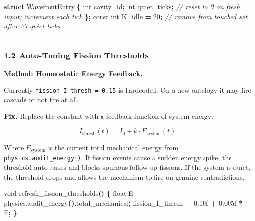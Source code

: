 \documentclass[
  11pt,
  a4paper,
]{article}
\newenvironment{Shaded}{\begin{snugshade}}{\end{snugshade}}
\newcommand{\AttributeTok}[1]{\textcolor[rgb]{0.13,0.29,0.53}{#1}}
\newcommand{\BuiltInTok}[1]{#1}
\newcommand{\CommentTok}[1]{\textcolor[rgb]{0.56,0.35,0.01}{\textit{#1}}}
\newcommand{\DataTypeTok}[1]{\textcolor[rgb]{0.13,0.29,0.53}{#1}}
\newcommand{\DecValTok}[1]{\textcolor[rgb]{0.00,0.00,0.81}{#1}}
\newcommand{\FloatTok}[1]{\textcolor[rgb]{0.00,0.00,0.81}{#1}}
\newcommand{\KeywordTok}[1]{\textcolor[rgb]{0.13,0.29,0.53}{\textbf{#1}}}
\newcommand{\NormalTok}[1]{#1}
\newcommand{\OperatorTok}[1]{\textcolor[rgb]{0.81,0.36,0.00}{\textbf{#1}}}
\begin{document}
\begin{Shaded}
\begin{Highlighting}[]
\KeywordTok{struct}\NormalTok{ WavefrontEntry }\OperatorTok{\{}
    \DataTypeTok{int}\NormalTok{ cavity\_id}\OperatorTok{;}
    \DataTypeTok{int}\NormalTok{ quiet\_ticks}\OperatorTok{;}   \CommentTok{// reset to 0 on fresh input; increment each tick}
\OperatorTok{\};}
\AttributeTok{const} \DataTypeTok{int}\NormalTok{ K\_idle }\OperatorTok{=} \DecValTok{20}\OperatorTok{;}   \CommentTok{// remove from touched set after 20 quiet ticks}
\end{Highlighting}
\end{Shaded}

\begin{center}\rule{0.5\linewidth}{0.5pt}\end{center}

\subsubsection{1.2 Auto-Tuning Fission
Thresholds}\label{auto-tuning-fission-thresholds}

\textbf{Method: Homeostatic Energy Feedback.}

Currently \texttt{fission\_I\_thresh\ =\ 0.15} is hardcoded. On a new
ontology it may fire cascade or not fire at all.

\textbf{Fix.} Replace the constant with a feedback function of system
energy:

\[
I_\text{thresh}(t) = I_0 + k \cdot E_\text{system}(t)
\]

Where \(E_\text{system}\) is the current total mechanical energy from
\texttt{physics.audit\_energy()}. If fission events cause a sudden
energy spike, the threshold auto-raises and blocks spurious follow-up
fissions. If the system is quiet, the threshold drops and allows the
mechanism to fire on genuine contradictions.

\begin{Shaded}
\begin{Highlighting}[]
\DataTypeTok{void}\NormalTok{ refresh\_fission\_thresholds}\OperatorTok{()} \OperatorTok{\{}
    \DataTypeTok{float}\NormalTok{ E }\OperatorTok{=}\NormalTok{ physics}\OperatorTok{.}\NormalTok{audit\_energy}\OperatorTok{().}\NormalTok{total\_mechanical}\OperatorTok{;}
\NormalTok{    fission\_I\_thresh }\OperatorTok{=} \FloatTok{0.10}\BuiltInTok{f} \OperatorTok{+} \FloatTok{0.005}\BuiltInTok{f} \OperatorTok{*}\NormalTok{ E}\OperatorTok{;}
\OperatorTok{\}}
\end{Highlighting}
\end{Shaded}
\end{document}
